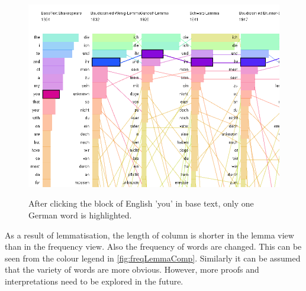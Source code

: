 \begin{figure}[H]
	\centering	
	\includegraphics[scale=0.5]{Figs/You-In-Lemma}\\[1ex]
	\caption{After clicking the block of English 'you' in base text, only one German word is highlighted.}
	\label{fig:youInLemma}
\end{figure} 

As a result of lemmatisation, the length of column is shorter in the lemma view than in the frequency view. Also the frequency of words are changed. This can be seen from the colour legend in \ref{fig:freqLemmaComp}. Similarly it can be assumed that the variety of words are more obvious. However, more proofs and interpretations need to be explored in the future.

